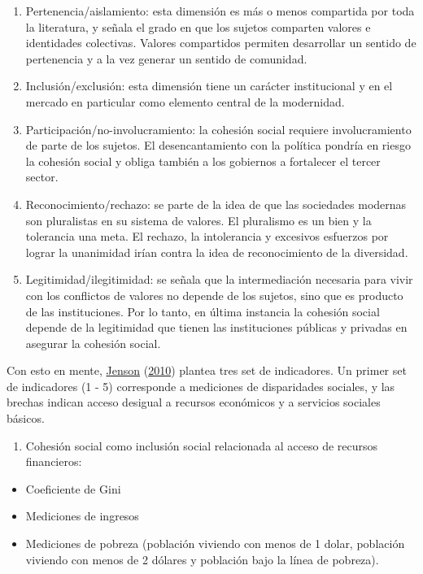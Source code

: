 \documentclass[
  12pt,
]{book}
\providecommand{\tightlist}{%
  \setlength{\itemsep}{0pt}\setlength{\parskip}{0pt}}
\begin{document}
\begin{enumerate}
\def\labelenumi{\arabic{enumi}.}
\item
  Pertenencia/aislamiento: esta dimensión es más o menos compartida por toda la literatura, y señala el grado en que los sujetos comparten valores e identidades colectivas. Valores compartidos permiten desarrollar un sentido de pertenencia y a la vez generar un sentido de comunidad.
\item
  Inclusión/exclusión: esta dimensión tiene un carácter institucional y en el mercado en particular como elemento central de la modernidad.
\item
  Participación/no-involucramiento: la cohesión social requiere involucramiento de parte de los sujetos. El desencantamiento con la política pondría en riesgo la cohesión social y obliga también a los gobiernos a fortalecer el tercer sector.
\item
  Reconocimiento/rechazo: se parte de la idea de que las sociedades modernas son pluralistas en su sistema de valores. El pluralismo es un bien y la tolerancia una meta. El rechazo, la intolerancia y excesivos esfuerzos por lograr la unanimidad irían contra la idea de reconocimiento de la diversidad.
\item
  Legitimidad/ilegitimidad: se señala que la intermediación necesaria para vivir con los conflictos de valores no depende de los sujetos, sino que es producto de las instituciones. Por lo tanto, en última instancia la cohesión social depende de la legitimidad que tienen las instituciones públicas y privadas en asegurar la cohesión social.
\end{enumerate}

Con esto en mente, \protect\hyperlink{ref-jenson2010defining}{Jenson} (\protect\hyperlink{ref-jenson2010defining}{2010}) plantea tres set de indicadores. Un primer set de indicadores (1 - 5) corresponde a mediciones de disparidades sociales, y las brechas indican acceso desigual a recursos económicos y a servicios sociales básicos.

\begin{enumerate}
\def\labelenumi{\arabic{enumi}.}
\tightlist
\item
  Cohesión social como inclusión social relacionada al acceso de recursos financieros:
\end{enumerate}

\begin{itemize}
\tightlist
\item
  Coeficiente de Gini
\item
  Mediciones de ingresos
\item
  Mediciones de pobreza (población viviendo con menos de 1 dolar, población viviendo con menos de 2 dólares y población bajo la línea de pobreza).
\end{itemize}
\end{document}
